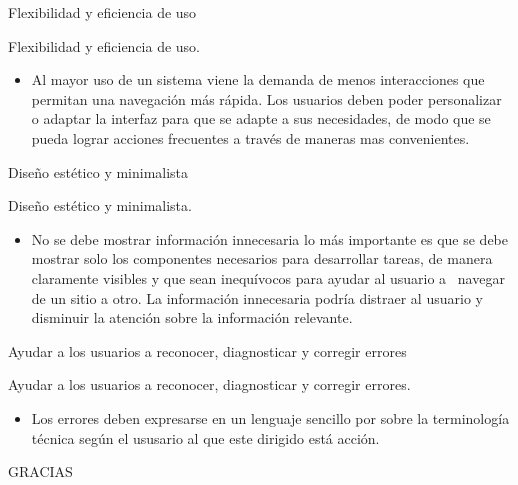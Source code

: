 \documentclass[aspectratio=169]{beamer}
\begin{document}
\begin{frame}{Flexibilidad y eficiencia de uso}
  
  \begin{block}{Flexibilidad y eficiencia de uso.}
  \begin{itemize}    
    \item Al mayor uso de un sistema viene la demanda de menos interacciones que permitan una navegación más rápida. Los usuarios deben poder personalizar o adaptar la interfaz para que se adapte a sus necesidades, de modo que se pueda lograr acciones frecuentes a través de maneras mas convenientes.

  \end{itemize}
  \end{block}

\end{frame}

\begin{frame}{Diseño estético y minimalista}
  
  \begin{block}{Diseño estético y minimalista.}
  \begin{itemize}    
    \item No se debe mostrar información innecesaria lo más importante es que se debe mostrar solo los componentes necesarios para desarrollar tareas, de manera claramente visibles y que sean inequívocos para ayudar al usuario a  navegar de un sitio a otro. La información innecesaria podría distraer al usuario y disminuir la atención sobre la información relevante.

  \end{itemize}
  \end{block}

\end{frame}

\begin{frame}{Ayudar a los usuarios a reconocer, diagnosticar y corregir errores}
  
  \begin{block}{Ayudar a los usuarios a reconocer, diagnosticar y corregir errores.}
  \begin{itemize}    
    \item Los errores deben expresarse en un lenguaje sencillo por sobre la terminología técnica según el ususario al que este dirigido está acción.

  \end{itemize}
  \end{block}

\end{frame}




\begin{frame}{}
  \centering\Huge
  GRACIAS
\end{frame}

\end{document}
